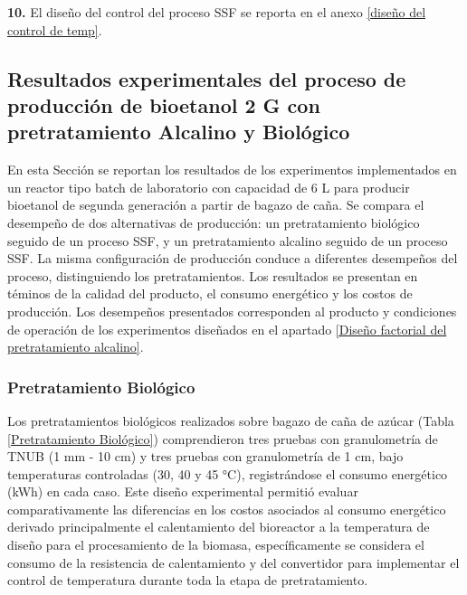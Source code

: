 \documentclass[12pt]{article}
\begin{document}
	     	
	     	\textbf{10.} El diseño del control del proceso SSF se reporta en el anexo \ref{diseño del control de temp}.
	     	
	     	
			
			
		

				\subsection{Resultados experimentales del proceso de producción de bioetanol 2 G con pretratamiento Alcalino  y Biológico}
				En esta Sección se reportan los resultados de los experimentos implementados en un reactor tipo batch de laboratorio con capacidad de 6 L para producir bioetanol de segunda generación a partir de bagazo de caña. Se compara el desempeño de dos alternativas de producción: un pretratamiento biológico seguido de un proceso SSF, y un pretratamiento alcalino seguido de un proceso SSF. La misma configuración de producción conduce a diferentes desempeños del proceso, distinguiendo los pretratamientos. Los resultados se presentan en téminos de la calidad del producto, el consumo energético y los costos de producción. Los desempeños presentados corresponden al producto y condiciones de operación de los experimentos diseñados en el apartado \ref{Diseño factorial del pretratamiento alcalino}.
				
				
				
		
		\subsubsection{Pretratamiento Biológico}
	Los pretratamientos biológicos realizados sobre bagazo de caña de azúcar (Tabla \ref{Pretratamiento Biológico}) comprendieron tres pruebas con granulometría de TNUB (1 mm - 10 cm) y tres pruebas con granulometría de 1 cm, bajo temperaturas controladas (30, 40 y 45 °C), registrándose el consumo energético (kWh) en cada caso. Este diseño experimental permitió evaluar comparativamente las diferencias en los costos asociados al consumo energético derivado principalmente el calentamiento del bioreactor a la temperatura de diseño para el procesamiento de la biomasa, específicamente se considera el consumo de la resistencia de calentamiento y del convertidor para implementar el control de temperatura durante toda la etapa de pretratamiento. 
		
\end{document}
